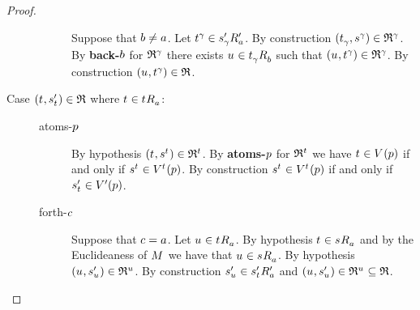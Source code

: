 \begin{proof}
\begin{description}
\begin{description}
                Suppose that $\agentB \neq \agentA$.
                Let $\kStateT[\gamma] \in \kSuccessorsPA{\kStateSP_\gamma}$.
                By construction $(\kStateT_\gamma, \kStateS[\gamma]) \in \refinement^\gamma$.
                By {\bf back-$\agentB$} for $\refinement^\gamma$ there exists $\kStateU \in \kSuccessorsB{\kStateT_\gamma}$ such that $(\kStateU, \kStateT[\gamma]) \in \refinement^\gamma$.
                By construction $(\kStateU, \kStateT[\gamma]) \in \refinement$.
        \end{description}
    \item[Case $(\kStateT, \kStateSP_{\kStateT}) \in \refinement$ where $\kStateT \in \kSuccessorsA{\kStateT}$:]
        \hfill
        \begin{description}
            \item[atoms-$\atomP$] 
                By hypothesis $(\kStateT, \kStateS[\kStateT]) \in \refinement^{\kStateT}$.
                By {\bf atoms-$\atomP$} for $\refinement^{\kStateT}$ we have $\kStateT \in \kValuation(\atomP)$ if and only if $\kStateS[\kStateT] \in \kValuation[\kStateT](\atomP)$.
                By construction $\kStateS[\kStateT] \in \kValuation[\kStateT](\atomP)$ if and only if $\kStateSP_{\kStateT} \in \kValuationP(\atomP)$.
            \item[forth-$\agentC$]
                Suppose that $\agentC = \agentA$.
                Let $\kStateU \in \kSuccessorsA{\kStateT}$.
                By hypothesis $\kStateT \in \kSuccessorsA{\kStateS}$ and by the Euclideaness of $\kModel$ we have that $\kStateU \in \kSuccessorsA{\kStateS}$.
                By hypothesis $(\kStateU, \kStateSP_{\kStateU}) \in \refinement^{\kStateU}$.
                By construction $\kStateSP_{\kStateU} \in \kSuccessorsPA{\kStateSP_{\kStateT}}$ and $(\kStateU, \kStateSP_{\kStateU}) \in \refinement^{\kStateU} \subseteq \refinement$.


\end{description}
\end{description}
\end{proof}
